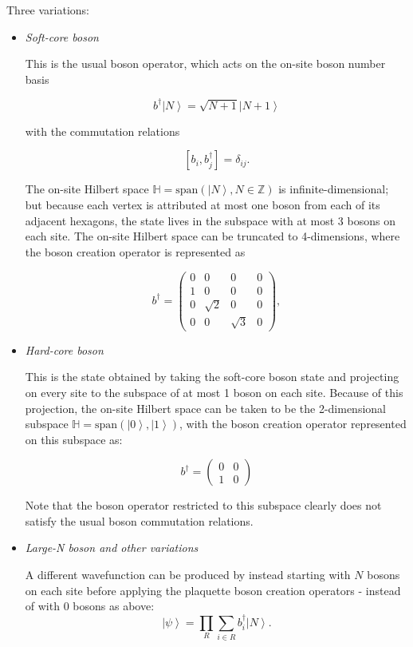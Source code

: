 \documentclass{article}
\newcommand{\ket}[1]{\left |#1 \right \rangle}
\begin{document}
Three variations:
\begin{itemize}
\item \emph{Soft-core boson}

This is the usual boson operator, which acts on the on-site boson number basis

$$ b^{\dagger} \ket{N} = \sqrt{N+1} \ket{N+1} $$

with the commutation relations 

$$ [b_i, b_j^{\dagger}] = \delta_{ij}.$$

The on-site Hilbert space $ \mathbb{H} = \text{span} ( \ket{N}, N \in \mathbb{Z} )$ is infinite-dimensional; but because each vertex is attributed at most one boson from each of its adjacent hexagons, the state lives in the subspace with at most 3 bosons on each site. The on-site Hilbert space can be truncated to 4-dimensions, where the boson creation operator is represented as

$$b^{\dagger} =  \left( \begin{array}{cccc}
0 & 0 & 0 & 0 \\
1 & 0 & 0 & 0 \\
0 & \sqrt{2} & 0 & 0 \\
0 & 0 & \sqrt{3} & 0 \end{array} \right), 
$$

\item \emph{Hard-core boson}

This is the state obtained by taking the soft-core boson state and projecting on every site to the subspace of at most 1 boson on each site. Because of this projection, the on-site Hilbert space can be taken to be the 2-dimensional subspace $\mathbb{H} = \text{span}(\ket{0}, \ket{1})$, with the boson creation operator represented on this subspace as:

$$b^{\dagger} =  \left( \begin{array}{cccc}
0 & 0 \\
1 & 0 \end{array} \right) 
$$

Note that the boson operator restricted to this subspace clearly does not satisfy the usual boson commutation relations. 

\item \emph{Large-N boson and other variations}

A different wavefunction can be produced by instead starting with $N$ bosons on each site before applying the plaquette boson creation operators - instead of with $0$ bosons as above:
$$
\ket{\psi} = \prod\limits_{R} \sum\limits_{i \in R} b^{\dagger}_{i} \ket{N}.
$$


\end{itemize}
\end{document}
